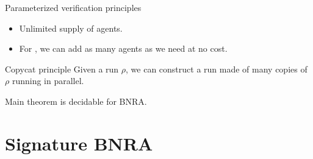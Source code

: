 \documentclass{beamer}
\begin{document}
\begin{frame}{Parameterized verification principles}
	
	\begin{itemize}
		\item Unlimited supply of agents.
		
		\item For {}, we can add as many agents as we need at no cost. 
	\end{itemize}
	
	\pause
	
	\begin{block}{Copycat principle}
		Given a run $\rho$, we can construct a run made of many copies of $\rho$ running in parallel.
	\end{block}
	
	\begin{block}{Main theorem}
		{} is decidable for BNRA.
	\end{block}


\end{frame}







\section{Signature BNRA}

\begin{frame}
	\tableofcontents[currentsection]
\end{frame}
\end{document}
